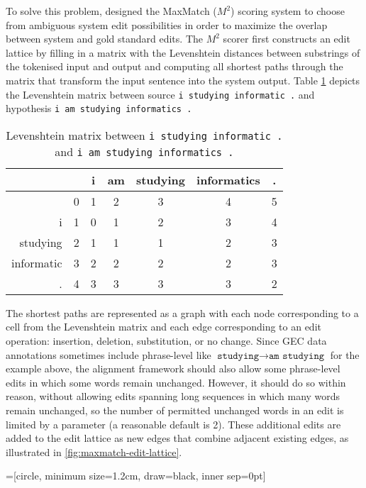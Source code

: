 To solve this problem, \citet{Dahlmeier2012BetterCorrection} designed the MaxMatch ($M^2$) scoring system to choose from ambiguous system edit possibilities in order to maximize the overlap between system and gold standard edits. The $M^2$ scorer first constructs an edit lattice by filling in a matrix with the Levenshtein distances between substrings of the tokenised input and output and computing all shortest paths through the matrix that transform the input sentence into the system output. Table \ref{tab:maxmatch-levenshtein-matrix} depicts the Levenshtein matrix between source \texttt{i studying informatic .} and hypothesis \texttt{i am studying informatics .}

\begin{table}[h]
\centering
\begin{tabular}{|r|c|c|c|c|c|c|}
\hline
 &  & i & am & studying & informatics & . \\ \hline
 & 0 & 1 & 2 & 3 & 4 & 5 \\ \hline
i & 1 & 0 & 1 & 2 & 3 & 4 \\ \hline
studying & 2 & 1 & 1 & 1 & 2 & 3 \\ \hline
informatic & 3 & 2 & 2 & 2 & 2 & 3 \\ \hline
. & 4 & 3 & 3 & 3 & 3 & 2 \\ \hline
\end{tabular}
\caption{Levenshtein matrix between \texttt{i studying informatic .} and \texttt{i am studying informatics .}}
\label{tab:maxmatch-levenshtein-matrix}
\end{table}

The shortest paths are represented as a graph with each node corresponding to a cell from the Levenshtein matrix and each edge corresponding to an edit operation: insertion, deletion, substitution, or no change. Since GEC data annotations sometimes include phrase-level like $\texttt{studying} \rightarrow \texttt{am studying}$ for the example above, the alignment framework should also allow some phrase-level edits in which some words remain unchanged. However, it should do so within reason, without allowing edits spanning long sequences in which many words remain unchanged, so the number of permitted unchanged words in an edit is limited by a parameter (a reasonable default is 2). These additional edits are added to the edit lattice as new edges that combine adjacent existing edges, as illustrated in \ref{fig:maxmatch-edit-lattice}.

=[circle, minimum size=1.2cm, draw=black, inner sep=0pt]

